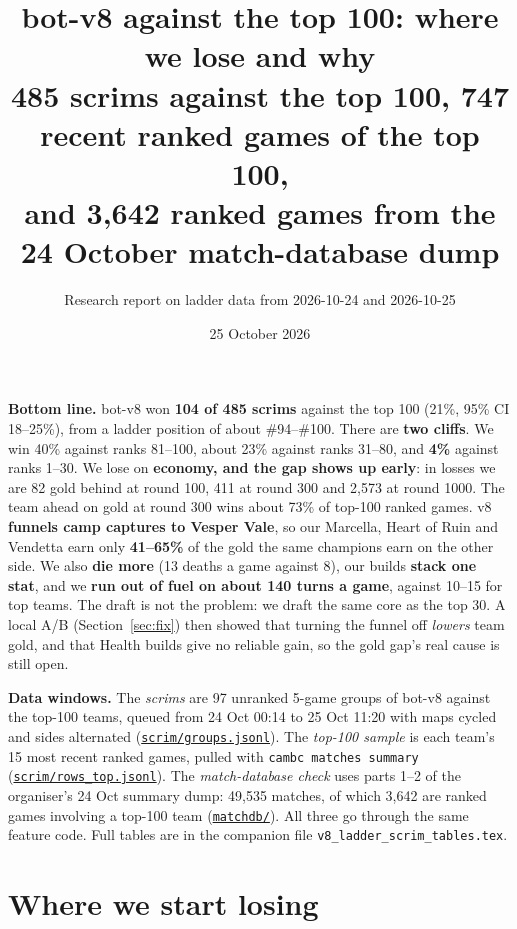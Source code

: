 \documentclass[11pt,a4paper]{article}
\title{\vspace{-1.2cm}\textbf{bot-v8 against the top 100: where we lose and why}\\[0.3em]
\large 485 scrims against the top 100, 747 recent ranked games of the top 100,\\ and 3,642 ranked games from the 24 October match-database dump}
\author{Research report on ladder data from 2026-10-24 and 2026-10-25}
\date{25 October 2026}
\newcommand{\data}{file:///Users/tristanbasri/Desktop/Code/battlecode-scrim-2026-10-25}
\newcommand{\src}[2]{{\small(\href{#1}{\textcolor{cTop}{\texttt{#2}}})}}
\begin{document}
\maketitle

\noindent\colorbox{cSoft}{\parbox{\dimexpr\linewidth-2\fboxsep}{\small
\textbf{Bottom line.} bot-v8 won \textbf{104 of 485 scrims} against the top 100 (21\%, 95\% CI 18--25\%), from a ladder position of about \#94--\#100. There are \textbf{two cliffs}. We win 40\% against ranks 81--100, about 23\% against ranks 31--80, and \textbf{4\%} against ranks 1--30. We lose on \textbf{economy, and the gap shows up early}: in losses we are 82 gold behind at round 100, 411 at round 300 and 2,573 at round 1000. The team ahead on gold at round 300 wins about 73\% of top-100 ranked games. v8 \textbf{funnels camp captures to Vesper Vale}, so our Marcella, Heart of Ruin and Vendetta earn only \textbf{41--65\%} of the gold the same champions earn on the other side. We also \textbf{die more} (13 deaths a game against 8), our builds \textbf{stack one stat}, and we \textbf{run out of fuel on about 140 turns a game}, against 10--15 for top teams. The draft is not the problem: we draft the same core as the top 30. A local A/B (Section~\ref{sec:fix}) then showed that turning the funnel off \emph{lowers} team gold, and that Health builds give no reliable gain, so the gold gap's real cause is still open.}}

\vspace{0.6em}
{\small\textbf{Data windows.} The \emph{scrims} are 97 unranked 5-game groups of bot-v8 against the top-100 teams, queued from 24 Oct 00:14 to 25 Oct 11:20 with maps cycled and sides alternated \src{\data/scrim/groups.jsonl}{scrim/groups.jsonl}. The \emph{top-100 sample} is each team's 15 most recent ranked games, pulled with \texttt{cambc matches summary} \src{\data/scrim/rows\_top.jsonl}{scrim/rows\_top.jsonl}. The \emph{match-database check} uses parts 1--2 of the organiser's 24 Oct summary dump: 49,535 matches, of which 3,642 are ranked games involving a top-100 team \src{\data/matchdb/}{matchdb/}. All three go through the same feature code. Full tables are in the companion file \texttt{v8\_ladder\_scrim\_tables.tex}.}

\tableofcontents

\section{Where we start losing}
\end{document}
